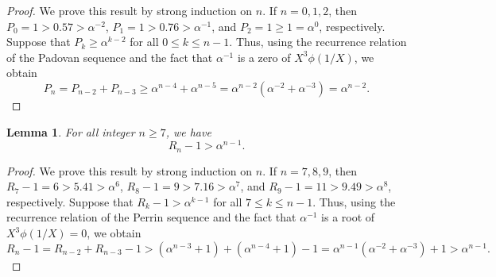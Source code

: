 \documentclass[11pt,a4paper]{article}
\newtheorem{lemma}[theorem]{Lemma}
\numberwithin{equation}{section}
\numberwithin{table}{section}
\numberwithin{figure}{section}
\begin{document}
\begin{proof}
We prove this result by strong induction on $n$. If $n=0,1,2$, then $P_{0}=1>0.57>\alpha^{-2}$, $P_{1}=1>0.76>\alpha^{-1}$, and $P_{2}=1\ge 1= \alpha^{0}$, respectively. Suppose that $P_{k}\ge \alpha^{k-2}$ for all $0\le k\le n-1$. Thus, using the recurrence relation of the Padovan sequence and the fact that $\alpha^{-1}$ is a zero of $X^{3}\phi(1/X)$, we obtain
$$
P_{n}=P_{n-2}+P_{n-3}\ge \alpha^{n-4}+\alpha^{n-5}=\alpha^{n-2}(\alpha^{-2}+\alpha^{-3})=\alpha^{n-2}.
$$
\end{proof}

\begin{lemma}\label{lem:growth_R}
	For all integer $n \ge 7$, we have
	\begin{equation*}
		R_{n}-1>\alpha^{n-1}.
	\end{equation*}
\end{lemma}

\begin{proof}
We prove this result by strong induction on $n$. If $n=7,8,9$, then $R_{7}-1=6>5.41>\alpha^{6}$, $R_{8}-1=9>7.16>\alpha^{7}$, and $R_{9}-1=11>9.49>\alpha^{8}$, respectively. Suppose that $R_{k}-1>\alpha^{k-1}$ for all $7\le k\le n-1$. Thus, using the recurrence relation of the Perrin sequence and the fact that $\alpha^{-1}$ is a root of $X^{3}\phi(1/X)=0$, we obtain
$$
R_{n}-1=R_{n-2}+R_{n-3}-1>(\alpha^{n-3}+1)+(\alpha^{n-4}+1)-1=\alpha^{n-1}(\alpha^{-2}+\alpha^{-3})+1>\alpha^{n-1}.
$$
\end{proof}
\end{document}
